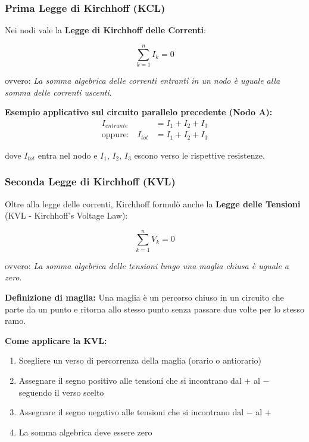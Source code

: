 \documentclass[a4paper,12pt]{article}
\begin{document}
\subsubsection{Prima Legge di Kirchhoff (KCL)}

Nei nodi vale la \textbf{Legge di Kirchhoff delle Correnti}:

\begin{equation}
\sum_{k=1}^{n} I_k = 0
\end{equation}

ovvero: \textit{La somma algebrica delle correnti entranti in un nodo è uguale alla somma delle correnti uscenti}.

\textbf{Esempio applicativo sul circuito parallelo precedente (Nodo A):}
\begin{align*}
I_{entrante} &= I_1 + I_2 + I_3 \\
\text{oppure:}\quad I_{tot} &= I_1 + I_2 + I_3
\end{align*}

dove $I_{tot}$ entra nel nodo e $I_1$, $I_2$, $I_3$ escono verso le rispettive resistenze.

\subsubsection{Seconda Legge di Kirchhoff (KVL)}

Oltre alla legge delle correnti, Kirchhoff formulò anche la \textbf{Legge delle Tensioni} (KVL - Kirchhoff's Voltage Law):

\begin{equation}
\sum_{k=1}^{n} V_k = 0
\end{equation}

ovvero: \textit{La somma algebrica delle tensioni lungo una maglia chiusa è uguale a zero}.

\textbf{Definizione di maglia:}
Una maglia è un percorso chiuso in un circuito che parte da un punto e ritorna allo stesso punto senza passare due volte per lo stesso ramo.

\textbf{Come applicare la KVL:}
\begin{enumerate}
    \item Scegliere un verso di percorrenza della maglia (orario o antiorario)
    \item Assegnare il segno positivo alle tensioni che si incontrano dal $+$ al $-$ seguendo il verso scelto
    \item Assegnare il segno negativo alle tensioni che si incontrano dal $-$ al $+$
    \item La somma algebrica deve essere zero
\end{enumerate}
\end{document}
